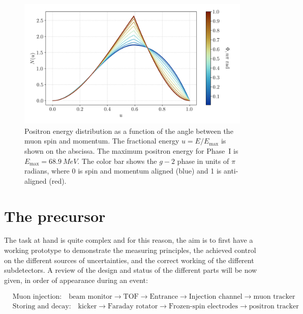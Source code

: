 \begin{refsection}
    \begin{figure}
    \centering
        \includegraphics[width=0.66\columnwidth]{Figures/muEDM/n_vs_phi.png}
        \caption[muEDM: Positron energy distribution]{Positron energy distribution as a function of the angle between the muon spin and momentum. The fractional energy $u = E/E_\text{max}$ is shown on the abscissa. The maximum positron energy for Phase~I is $E_\text{max} = \SI{68.9}{MeV}$. The color bar shows the $g-2$ phase in units of $\pi$ radians, where 0 is spin and momentum aligned (blue) and 1 is anti-aligned (red).
        }
    \label{fig:n_vs_phi}
    \end{figure}

\section{The precursor}
    The task at hand is quite complex and for this reason, the aim is to first have a working prototype to demonstrate the measuring principles, the achieved control on the different sources of uncertainties, and the correct working of the different subdetectors.
    A review of the design and status of the different parts will be now given, in order of appearance during an event:
    \begin{center}
        \vspace*{-3em} %
        \begin{align*}
        &\text{Muon injection:} \quad \text{beam monitor} \rightarrow \text{TOF} \rightarrow \text{Entrance} \rightarrow \text{Injection channel} \rightarrow \text{muon tracker} \\
        &\text{Storing and decay:} \quad \text{kicker} \rightarrow \text{Faraday rotator} \rightarrow \text{Frozen-spin electrodes} \rightarrow \text{positron tracker}
        \end{align*}
        \vspace*{-3em} %
    \end{center}
    

\end{refsection}
